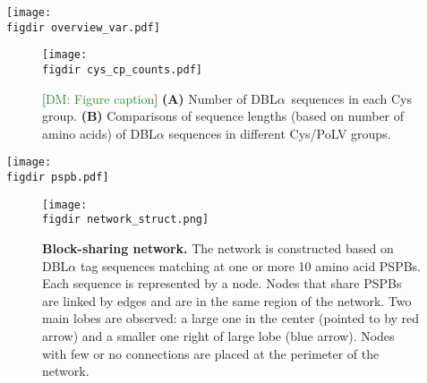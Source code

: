 \documentclass[10pt,twocolumn,superscriptaddress]{revtex4-1}
\newcommand{\dieumycom}[1]{[\textcolor{ForestGreen}{DM: #1}]}
\newcommand{\pfem}{{PfEMP1}\xspace}
\newcommand{\dbla}{{DBL$\alpha$}\xspace}
\newcommand{\cp}{{Cys/PoLV}\xspace}
\newcommand{\figdir}{figures/}
\begin{document}
\begin{figure*}[t]
	\centering
	\texttt{[image: \\figdir overview\_var.pdf]}
	\caption{\textbf{Overview of \pfem,} the \textit{Plasmodium falciparum} virulence factor encoded by \textit{var} genes. \pfem molecules are usually made up of two to nine domains: N-terminal segment (NTS), Duffy binding-like (DBL), cysteine-rich inter-domain region (CIDR), transmembrane (TM), and the intracellular acidic terminal segment (ATS) domains. The \dbla subdomain, called "tag," can be classified by two methods: 1) the \cp groups based on number of cysteines and the presence either (or neither) motif MFK or REY, 2) block-sharing groups based on sequences sharing position-specific polymorphic blocks (PSPBs). This diagram shows an example \dbla tag sequence, with the PSPBs highlighted in blue, the two cysteines in pink, and the motif MFK belonfing to PoLV group 1 in orange.}
	\label{overview}
\end{figure*}

\begin{figure}[t]
	\centering
	\texttt{[image: \\figdir cys\_cp\_counts.pdf]}
	\caption{ \dieumycom{Figure caption} \textbf{(A)} Number of \dbla\ sequences in each Cys group.  \textbf{(B)} Comparisons of sequence lengths (based on number of amino acids) of \dbla sequences in different \cp groups.}
	\label{cp}
\end{figure}

\begin{figure*}[t]
	\centering
	\texttt{[image: \\figdir pspb.pdf]}
	\caption{{\bf Position specific polymorphic blocks (PSPBs)}. Four polymorphic blocks (purple) for four example tag sequences at fixed locations based on three conserved anchor points shaded in orange. }
	\label{pspb}
\end{figure*}

\begin{figure}[t]
	\centering
	\texttt{[image: \\figdir network\_struct.png]}
	\caption{{\bf Block-sharing network.} The network is constructed based on \dbla tag sequences matching at one or more 10 amino acid PSPBs. Each sequence is represented by a node. Nodes that share PSPBs are linked by edges and are in the same region of the network. Two main lobes are observed: a large one in the center (pointed to by red arrow) and a smaller one right of large lobe (blue arrow). Nodes with few or no connections are placed at the perimeter of the network.}
	\label{struct}
\end{figure}
\end{document}
